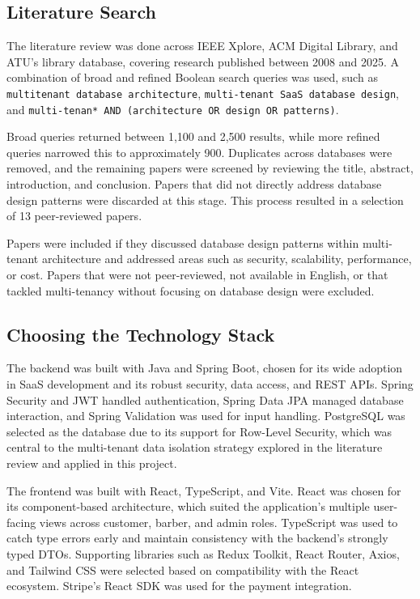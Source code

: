 \subsection*{Literature Search}
The literature review was done across IEEE Xplore, ACM Digital Library, and ATU's library database, covering research published between 2008 and 2025. A combination of broad and refined Boolean search queries was used, such as \texttt{multitenant database architecture}, \texttt{multi-tenant SaaS database design}, and \texttt{multi-tenan* AND (architecture OR design OR patterns)}.

Broad queries returned between 1,100 and 2,500 results, while more refined queries narrowed this to approximately 900. Duplicates across databases were removed, and the remaining papers were screened by reviewing the title, abstract, introduction, and conclusion. Papers that did not directly address database design patterns were discarded at this stage. This process resulted in a selection of 13 peer-reviewed papers.

Papers were included if they discussed database design patterns within multi-tenant architecture and addressed areas such as security, scalability, performance, or cost. Papers that were not peer-reviewed, not available in English, or that tackled multi-tenancy without focusing on database design were excluded.

\subsection*{Choosing the Technology Stack}
The backend was built with Java and Spring Boot, chosen for its wide adoption in SaaS development and its robust security, data access, and REST APIs. Spring Security and JWT handled authentication, Spring Data JPA managed database interaction, and Spring Validation was used for input handling. PostgreSQL was selected as the database due to its support for Row-Level Security, which was central to the multi-tenant data isolation strategy explored in the literature review and applied in this project.

The frontend was built with React, TypeScript, and Vite. React was chosen for its component-based architecture, which suited the application's multiple user-facing views across customer, barber, and admin roles. TypeScript was used to catch type errors early and maintain consistency with the backend's strongly typed DTOs. Supporting libraries such as Redux Toolkit, React Router, Axios, and Tailwind CSS were selected based on compatibility with the React ecosystem. Stripe's React SDK was used for the payment integration.

